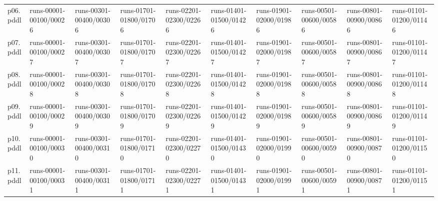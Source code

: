 \documentclass{article}
\begin{document}
\begin{tabular}{@{}lrrrrrrrrr@{}}
p06.pddl & \multicolumn{1}{|l|}{runs-00001-00100/00026} & \multicolumn{1}{|l|}{runs-00301-00400/00306} & \multicolumn{1}{|l|}{runs-01701-01800/01706} & \multicolumn{1}{|l|}{runs-02201-02300/02266} & \multicolumn{1}{|l|}{runs-01401-01500/01426} & \multicolumn{1}{|l|}{runs-01901-02000/01986} & \multicolumn{1}{|l|}{runs-00501-00600/00586} & \multicolumn{1}{|l|}{runs-00801-00900/00866} & \multicolumn{1}{|l|}{runs-01101-01200/01146} \\
p07.pddl & \multicolumn{1}{|l|}{runs-00001-00100/00027} & \multicolumn{1}{|l|}{runs-00301-00400/00307} & \multicolumn{1}{|l|}{runs-01701-01800/01707} & \multicolumn{1}{|l|}{runs-02201-02300/02267} & \multicolumn{1}{|l|}{runs-01401-01500/01427} & \multicolumn{1}{|l|}{runs-01901-02000/01987} & \multicolumn{1}{|l|}{runs-00501-00600/00587} & \multicolumn{1}{|l|}{runs-00801-00900/00867} & \multicolumn{1}{|l|}{runs-01101-01200/01147} \\
p08.pddl & \multicolumn{1}{|l|}{runs-00001-00100/00028} & \multicolumn{1}{|l|}{runs-00301-00400/00308} & \multicolumn{1}{|l|}{runs-01701-01800/01708} & \multicolumn{1}{|l|}{runs-02201-02300/02268} & \multicolumn{1}{|l|}{runs-01401-01500/01428} & \multicolumn{1}{|l|}{runs-01901-02000/01988} & \multicolumn{1}{|l|}{runs-00501-00600/00588} & \multicolumn{1}{|l|}{runs-00801-00900/00868} & \multicolumn{1}{|l|}{runs-01101-01200/01148} \\
p09.pddl & \multicolumn{1}{|l|}{runs-00001-00100/00029} & \multicolumn{1}{|l|}{runs-00301-00400/00309} & \multicolumn{1}{|l|}{runs-01701-01800/01709} & \multicolumn{1}{|l|}{runs-02201-02300/02269} & \multicolumn{1}{|l|}{runs-01401-01500/01429} & \multicolumn{1}{|l|}{runs-01901-02000/01989} & \multicolumn{1}{|l|}{runs-00501-00600/00589} & \multicolumn{1}{|l|}{runs-00801-00900/00869} & \multicolumn{1}{|l|}{runs-01101-01200/01149} \\
p10.pddl & \multicolumn{1}{|l|}{runs-00001-00100/00030} & \multicolumn{1}{|l|}{runs-00301-00400/00310} & \multicolumn{1}{|l|}{runs-01701-01800/01710} & \multicolumn{1}{|l|}{runs-02201-02300/02270} & \multicolumn{1}{|l|}{runs-01401-01500/01430} & \multicolumn{1}{|l|}{runs-01901-02000/01990} & \multicolumn{1}{|l|}{runs-00501-00600/00590} & \multicolumn{1}{|l|}{runs-00801-00900/00870} & \multicolumn{1}{|l|}{runs-01101-01200/01150} \\
p11.pddl & \multicolumn{1}{|l|}{runs-00001-00100/00031} & \multicolumn{1}{|l|}{runs-00301-00400/00311} & \multicolumn{1}{|l|}{runs-01701-01800/01711} & \multicolumn{1}{|l|}{runs-02201-02300/02271} & \multicolumn{1}{|l|}{runs-01401-01500/01431} & \multicolumn{1}{|l|}{runs-01901-02000/01991} & \multicolumn{1}{|l|}{runs-00501-00600/00591} & \multicolumn{1}{|l|}{runs-00801-00900/00871} & \multicolumn{1}{|l|}{runs-01101-01200/01151} \\

\end{tabular}
\end{document}
